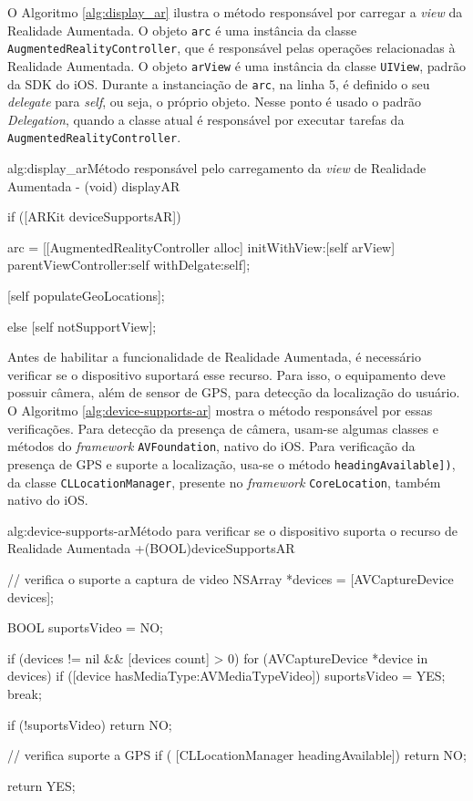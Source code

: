 O Algoritmo \ref{alg:display_ar} ilustra o método responsável por carregar a \textit{view}
da Realidade Aumentada. O objeto \texttt{arc} é uma instância da classe 
\texttt{AugmentedRealityController}, que é responsável pelas operações relacionadas à
Realidade Aumentada. O objeto \texttt{arView} é uma instância da classe \texttt{UIView},
padrão da \gls{SDK} do iOS. Durante a instanciação de \texttt{arc}, na linha 5, é definido o seu
\textit{delegate} para \textit{self}, ou seja, o próprio objeto. Nesse ponto é usado o 
padrão \textit{Delegation}, quando a classe atual é responsável por executar tarefas da
\texttt{AugmentedRealityController}.


\begin{sourcecode}{alg:display_ar}{Método responsável pelo carregamento da \textit{view} de Realidade Aumentada}
- (void) displayAR
{
    if ([ARKit deviceSupportsAR])
    {
        arc = [[AugmentedRealityController alloc] initWithView:[self arView] parentViewController:self withDelgate:self];

        [self populateGeoLocations];
    }
    else
    {
        [self notSupportView];
    }
}
\end{sourcecode}


Antes de habilitar a funcionalidade de Realidade Aumentada, é necessário verificar se o dispositivo
suportará esse recurso. Para isso, o equipamento deve possuir câmera, além de sensor de \gls{GPS},
para detecção da localização do usuário. O Algoritmo \ref{alg:device-supports-ar} mostra o método
responsável por essas verificações. Para detecção da presença de câmera, usam-se algumas classes e
métodos do \textit{framework} \texttt{AVFoundation}, nativo do iOS. Para verificação da presença de
\gls{GPS} e suporte a localização, usa-se o método \texttt{headingAvailable])}, da classe 
\texttt{CLLocationManager}, presente no \textit{framework} \texttt{CoreLocation}, 
também nativo do iOS.

\begin{sourcecode}{alg:device-supports-ar}{Método para verificar se o dispositivo suporta o recurso de Realidade Aumentada}
+(BOOL)deviceSupportsAR
{
    // verifica o suporte a captura de video
    NSArray *devices = [AVCaptureDevice devices];

    BOOL suportsVideo = NO;

    if (devices != nil && [devices count] > 0) 
    {
        for (AVCaptureDevice *device in devices) 
        {
            if ([device hasMediaType:AVMediaTypeVideo]) 
            {
                suportsVideo = YES;
                break;
            }
        }
    }

    if (!suportsVideo)
    {
        return NO;
    }
    
    // verifica suporte a GPS
	if ( [CLLocationManager headingAvailable])
	{
		return NO;
	}

	return YES;
}
\end{sourcecode}



